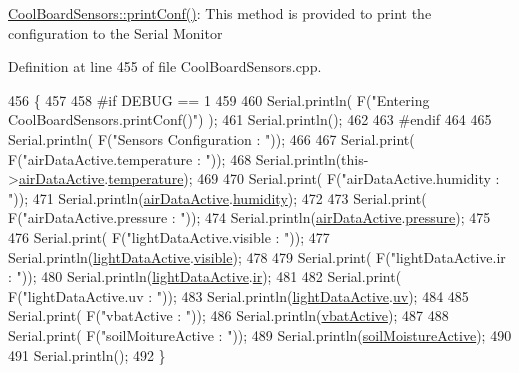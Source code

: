 \hyperlink{class_cool_board_sensors_af6fd79505815b204c178617ecf54c873}{Cool\+Board\+Sensors\+::print\+Conf()}\+: This method is provided to print the configuration to the Serial Monitor 

Definition at line 455 of file Cool\+Board\+Sensors.\+cpp.


\begin{DoxyCode}
456 \{
457 
458 \textcolor{preprocessor}{#if DEBUG == 1}
459 
460     Serial.println( F(\textcolor{stringliteral}{"Entering CoolBoardSensors.printConf()"}) );
461     Serial.println();
462 
463 \textcolor{preprocessor}{#endif}
464 
465     Serial.println( F(\textcolor{stringliteral}{"Sensors Configuration : "}));
466     
467     Serial.print( F(\textcolor{stringliteral}{"airDataActive.temperature : "}));
468     Serial.println(this->\hyperlink{class_cool_board_sensors_abff8dfeccb2f7689847bb64d5f1cd31e}{airDataActive}.\hyperlink{struct_cool_board_sensors_1_1air_active_ac08576736c7ac3bfbfec32e5ee17c686}{temperature});
469 
470     Serial.print( F(\textcolor{stringliteral}{"airDataActive.humidity : "}));
471     Serial.println(\hyperlink{class_cool_board_sensors_abff8dfeccb2f7689847bb64d5f1cd31e}{airDataActive}.\hyperlink{struct_cool_board_sensors_1_1air_active_ab69738e9fd1c2ba80dc666bcd1e116f7}{humidity});
472 
473     Serial.print( F(\textcolor{stringliteral}{"airDataActive.pressure : "}));
474     Serial.println(\hyperlink{class_cool_board_sensors_abff8dfeccb2f7689847bb64d5f1cd31e}{airDataActive}.\hyperlink{struct_cool_board_sensors_1_1air_active_a15932ccfb6ee6603713d937ec9b76b72}{pressure});
475 
476     Serial.print( F(\textcolor{stringliteral}{"lightDataActive.visible : "}));
477     Serial.println(\hyperlink{class_cool_board_sensors_ac4deb1cf41bac8b91c780c92fab00ba4}{lightDataActive}.\hyperlink{struct_cool_board_sensors_1_1light_active_a9c351100969d0dc055ad2e6712cc7ac8}{visible});
478 
479     Serial.print( F(\textcolor{stringliteral}{"lightDataActive.ir : "}));
480     Serial.println(\hyperlink{class_cool_board_sensors_ac4deb1cf41bac8b91c780c92fab00ba4}{lightDataActive}.\hyperlink{struct_cool_board_sensors_1_1light_active_a4c21258d3c89c6292740d6deb10f9dcc}{ir});
481 
482     Serial.print( F(\textcolor{stringliteral}{"lightDataActive.uv : "}));
483     Serial.println(\hyperlink{class_cool_board_sensors_ac4deb1cf41bac8b91c780c92fab00ba4}{lightDataActive}.\hyperlink{struct_cool_board_sensors_1_1light_active_a0e6cfc311425a31f32c32fc3b834ffb8}{uv});
484     
485     Serial.print( F(\textcolor{stringliteral}{"vbatActive : "}));
486     Serial.println(\hyperlink{class_cool_board_sensors_ab0b4bbae83796b52b90f91008d383583}{vbatActive});
487 
488     Serial.print( F(\textcolor{stringliteral}{"soilMoitureActive : "}));
489     Serial.println(\hyperlink{class_cool_board_sensors_ae7971bf527781ac4994309591b78ab89}{soilMoistureActive});
490 
491     Serial.println();
492 \}
\end{DoxyCode}

